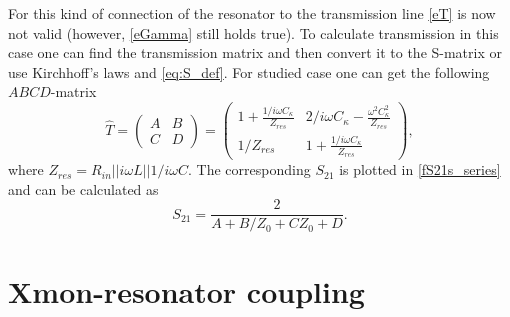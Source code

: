 \documentclass[12pt]{report}
\newcommand{\rbrkt}[1]{\left( #1 \right)}
\numberwithin{equation}{section}
\begin{document}
For this kind of connection of the resonator to the transmission line \eqref{eT} is now not valid (however, \eqref{eGamma} still holds true). To calculate transmission in this case one can find the transmission matrix and then convert it to the S-matrix or use Kirchhoff's laws and \eqref{eq:S_def}. For studied case one can get the following $ABCD$-matrix\cite{pozar2012}
\begin{equation}
\hat T = \rbrkt{\begin{matrix}
A & B \\
C & D
\end{matrix}} = \rbrkt{\begin{matrix}
1 + \frac{1/i\omega C_\kappa}{Z_{res}} & 2/i\omega C_\kappa - \frac{\omega^2 C_\kappa^2}{Z_{res}} \\
1/Z_{res} &  1 + \frac{1/i\omega C_\kappa}{Z_{res}} 
\end{matrix}},
\end{equation}
where $Z_{res} = R_{in}||i\omega L || 1/i\omega C$. The corresponding $S_{21}$ is  plotted in \autoref{fS21s_series} and can be calculated as\cite{pozar2012} 
\begin{equation}
S_{21} = \frac{2}{A+B/Z_0 +CZ_0 + D}.
\end{equation}

\chapter{Xmon-resonator coupling}
\end{document}
